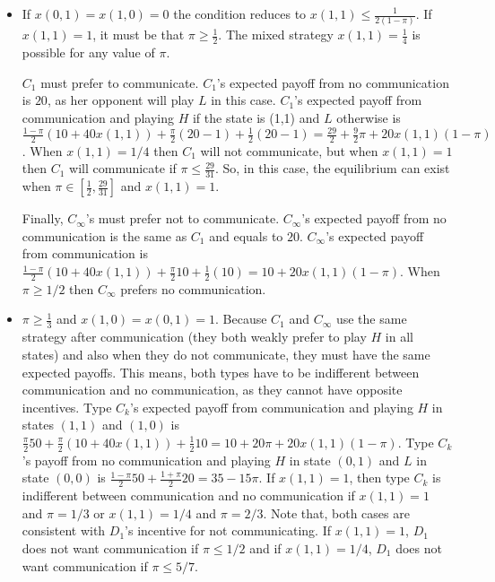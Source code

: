 \documentclass[12pt]{article}
\theoremstyle{definition}
\theoremstyle{remark}
\begin{document}
\begin{itemize}
    \item If $x(0,1)=x(1,0)=0$ the condition reduces to $x(1,1)\leq \frac{1}{2(1-\pi)}$. If $x(1,1)=1$, it must be that $\pi\geq \frac{1}{2}$. The mixed strategy $x(1,1)=\frac{1}{4}$ is possible for any value of $\pi$. 
    
    $C_1$ must prefer to communicate. $C_1$'s expected payoff from no communication is $20$, as her opponent will play $L$ in this case. $C_1$'s expected payoff from communication and playing $H$ if the state is (1,1) and $L$ otherwise is $\frac{1-\pi}{2}(10+40x(1,1))+\frac{\pi}{2}(20-1)+\frac{1}{2}(20-1)=\frac{29}{2}+\frac{9}{2}\pi+20x(1,1)(1-\pi)$. When $x(1,1)=1/4$ then $C_1$ will not communicate, but when $x(1,1)=1$ then $C_1$ will communicate if $\pi\leq \frac{29}{31}$. So, in this case, the equilibrium can exist when $\pi\in\left[\frac{1}{2},\frac{29}{31}\right]$ and $x(1,1)=1$.
    
Finally,  $C_\infty$'s must prefer not to communicate. $C_\infty$'s expected payoff from no communication is the same as $C_1$ and equals to $20$. $C_\infty$'s expected payoff from communication is $\frac{1-\pi}{2}(10+40x(1,1))+\frac{\pi}{2}10+\frac{1}{2}(10)=10+20x(1,1)(1-\pi)$. When $\pi\geq 1/2$ then $C_\infty$ prefers no communication.
    
\item $\pi\geq \frac{1}{3}$ and $x(1,0)=x(0,1)=1$. Because $C_1$ and $C_\infty$ use the same strategy after communication (they both weakly prefer to play $H$ in all states) and also when they do not communicate, they must have the same expected payoffs. This means, both types have to be indifferent between communication and no communication, as they cannot have opposite incentives. Type $C_k$'s expected payoff from communication and playing $H$ in states $(1,1)$ and $(1,0)$ is $\frac{\pi}{2}50 + \frac{\pi}{2}(10+40x(1,1))+\frac{1}{2}10= 10+20\pi+20x(1,1) (1-\pi)$. Type $C_k$'s payoff from no communication and playing $H$ in state $(0,1)$ and $L$ in state $(0,0)$ is $\frac{1-\pi}{2} 50 + \frac{1+\pi}{2} 20 = 35-15\pi$. If $x(1,1)=1$, then type $C_k$ is indifferent between communication and no communication if $x(1,1)=1$ and $\pi = 1/3$ or $x(1,1)=1/4$ and $\pi=2/3$. Note that, both cases are consistent with $D_1$'s incentive for not communicating. If $x(1,1)=1$, $D_1$ does not want communication if $\pi\leq 1/2$ and if $x(1,1)=1/4$, $D_1$ does not want communication if $\pi\leq 5/7$.


\end{itemize}
\end{document}
